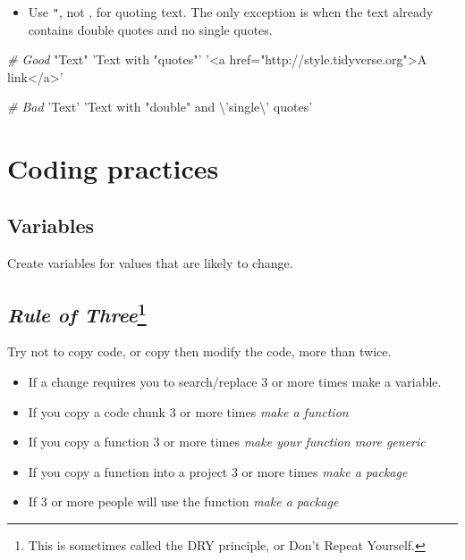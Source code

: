 \documentclass[]{book}
\newenvironment{Shaded}{\begin{snugshade}}{\end{snugshade}}
\newcommand{\CharTok}[1]{\textcolor[rgb]{0.31,0.60,0.02}{#1}}
\newcommand{\CommentTok}[1]{\textcolor[rgb]{0.56,0.35,0.01}{\textit{#1}}}
\newcommand{\StringTok}[1]{\textcolor[rgb]{0.31,0.60,0.02}{#1}}
\providecommand{\tightlist}{%
  \setlength{\itemsep}{0pt}\setlength{\parskip}{0pt}}
\let\rmarkdownfootnote\footnote%
\def\footnote{\protect\rmarkdownfootnote}
\theoremstyle{definition}
\theoremstyle{definition}
\theoremstyle{definition}
\theoremstyle{remark}
\begin{document}
\begin{itemize}
\tightlist
\item
  Use \texttt{"}, not \texttt{\textquotesingle{}}, for quoting text. The
  only exception is when the text already contains double quotes and no
  single quotes.
\end{itemize}

\begin{Shaded}
\begin{Highlighting}[]
\CommentTok{# Good}
\StringTok{"Text"}
\StringTok{'Text with "quotes"'}
\StringTok{'<a href="http://style.tidyverse.org">A link</a>'}

\CommentTok{# Bad}
\StringTok{'Text'}
\StringTok{'Text with "double" and }\CharTok{\textbackslash{}'}\StringTok{single}\CharTok{\textbackslash{}'}\StringTok{ quotes'}
\end{Highlighting}
\end{Shaded}

\hypertarget{coding-practices}{%
\section{Coding practices}\label{coding-practices}}

\hypertarget{variables}{%
\subsection{Variables}\label{variables}}

Create variables for values that are likely to change.

\hypertarget{rule-of-threedry}{%
\subsection[\emph{Rule of Three}]{\texorpdfstring{\emph{Rule of
Three}\footnote{This is sometimes called the DRY principle, or Don't
  Repeat Yourself.}}{Rule of Three}}\label{rule-of-threedry}}

Try not to copy code, or copy then modify the code, more than twice.

\begin{itemize}
\tightlist
\item
  If a change requires you to search/replace 3 or more times make a
  variable.
\item
  If you copy a code chunk 3 or more times \emph{make a function}
\item
  If you copy a function 3 or more times \emph{make your function more
  generic}
\item
  If you copy a function into a project 3 or more times \emph{make a
  package}
\item
  If 3 or more people will use the function \emph{make a package}
\end{itemize}
\end{document}

